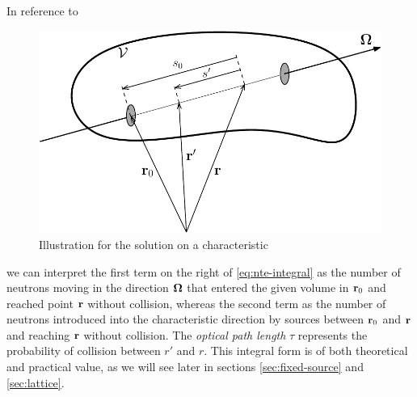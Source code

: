 In reference to 
\begin{figure}[hbp]
\begin{center}
  \includegraphics[scale=.75]{trepka}
  \caption{Illustration for the solution on a characteristic}
  \label{fig:trepka}
\end{center}
\end{figure}
we can interpret the first term on the right of \eqref{eq:nte-integral} as the number of
neutrons moving in the direction $\mathbf{\Omega}$ that entered the given volume in $\mathbf{r}_0$ and reached point $\mathbf{r}$ without
collision, whereas the second term as the number of neutrons introduced into the characteristic direction by sources 
between $\mathbf{r}_0$ and $\mathbf{r}$ and reaching $\mathbf{r}$ without collision. The \textit{optical path length} $\tau$ represents the 
probability of collision between $r'$ and $r$. This integral form is of both theoretical and practical value, as we will
see later in sections \ref{sec:fixed-source} and \ref{sec:lattice}.

